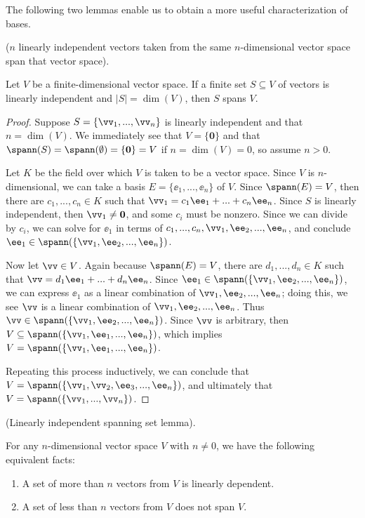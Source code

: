 The following two lemmas enable us to obtain a more useful characterization of bases.

\begin{lemma}
\label{ch::lin_alg::lemma::n_lin_indep_vectors_span_n_dim_space}
    ($n$ linearly independent vectors taken from the same $n$-dimensional vector space span that vector space).

    Let $V$ be a finite-dimensional vector space. If a finite set $S \subseteq V$ of vectors is linearly independent and $|S| = \dim(V)$, then $S$ spans $V$.
\end{lemma}

\begin{proof}

   Suppose $S = \{\vv_1, ..., \vv_n\}$ is linearly independent and that $n = \dim(V)$. We immediately see that $V = \{\mathbf{0}\}$ and that $\spann(S) = \spann(\emptyset) = \{\mathbf{0}\} = V$ if $n = \dim(V) = 0$, so assume $n > 0$.
   
   Let $K$ be the field over which $V$ is taken to be a vector space. Since $V$ is $n$-dimensional, we can take a basis $E = \{\ee_1, ..., \ee_n\}$ of $V$. Since $\spann(E) = V$, then there are $c_1, ..., c_n \in K$ such that ${\vv_1 = c_1 \ee_1 + ... + c_n \ee_n}$. Since $S$ is linearly independent, then $\vv_1 \neq \mathbf{0}$, and some $c_i$ must be nonzero. Since we can divide by $c_i$, we can solve for $\ee_1$ in terms of $c_1, ..., c_n, \vv_1, \ee_2, ..., \ee_n$, and conclude $\ee_1 \in \spann(\{\vv_1, \ee_2, ..., \ee_n\})$. 
   
   Now let $\vv \in V$. Again because $\spann(E) = V$, there are $d_1, ..., d_n \in K$ such that $\vv = d_1 \ee_1 + ... + d_n \ee_n$. Since $\ee_1 \in \spann(\{\vv_1, \ee_2, ..., \ee_n\})$, we can express $\ee_1$ as a linear combination of $\vv_1, \ee_2, ..., \ee_n$; doing this, we see $\vv$ is a linear combination of $\vv_1, \ee_2, ..., \ee_n$. Thus $\vv \in \spann(\{\vv_1, \ee_2, ..., \ee_n\})$. Since $\vv$ is arbitrary, then ${V \subseteq \spann(\{\vv_1, \ee_1, ..., \ee_n\})}$, which implies $V = \spann(\{\vv_1, \ee_1, ..., \ee_n\})$.

    Repeating this process inductively, we can conclude that $V = \spann(\{\vv_1, \vv_2, \ee_3, ..., \ee_n\})$, and ultimately that $V = \spann(\{\vv_1, ..., \vv_n\})$. 
\end{proof}

\begin{lemma}
\label{ch::lin_alg::lemma::dimension}
    (Linearly independent spanning set lemma). 
    
    For any $n$-dimensional vector space $V$ with $n \neq 0$, we have the following equivalent facts:
    
    \begin{enumerate}
        \item A set of more than $n$ vectors from $V$ is linearly dependent.
        \item A set of less than $n$ vectors from $V$ does not span $V$.
    \end{enumerate}
\end{lemma}

